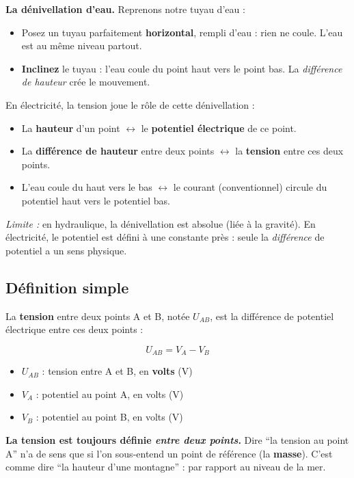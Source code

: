 \documentclass[12pt,a4paper,twoside]{book}
\begin{document}
\begin{analogie}
\textbf{La dénivellation d'eau.} Reprenons notre tuyau d'eau :
\begin{itemize}[nosep]
\item Posez un tuyau parfaitement \textbf{horizontal}, rempli d'eau : rien ne coule. L'eau est au même niveau partout.
\item \textbf{Inclinez} le tuyau : l'eau coule du point haut vers le point bas. La \textit{différence de hauteur} crée le mouvement.
\end{itemize}
En électricité, la tension joue le rôle de cette dénivellation :
\begin{itemize}[nosep]
\item La \textbf{hauteur} d'un point $\leftrightarrow$ le \textbf{potentiel électrique} de ce point.
\item La \textbf{différence de hauteur} entre deux points $\leftrightarrow$ la \textbf{tension} entre ces deux points.
\item L'eau coule du haut vers le bas $\leftrightarrow$ le courant (conventionnel) circule du potentiel haut vers le potentiel bas.
\end{itemize}
\textit{Limite :} en hydraulique, la dénivellation est absolue (liée à la gravité). En électricité, le potentiel est défini à une constante près : seule la \textit{différence} de potentiel a un sens physique.
\end{analogie}

\subsection{Définition simple}

La \textbf{tension} entre deux points A et B, notée $U_{AB}$, est la différence de potentiel électrique entre ces deux points :

\begin{formule}
\[
\boxed{U_{AB} = V_A - V_B}
\]
\begin{itemize}[nosep]
\item $U_{AB}$ : tension entre A et B, en \textbf{volts} (V)
\item $V_A$ : potentiel au point A, en volts (V)
\item $V_B$ : potentiel au point B, en volts (V)
\end{itemize}
\end{formule}

\begin{attention}
\textbf{La tension est toujours définie \textit{entre deux points}.} Dire ``la tension au point A'' n'a de sens que si l'on sous-entend un point de référence (la \textbf{masse}). C'est comme dire ``la hauteur d'une montagne'' : par rapport au niveau de la mer.
\end{attention}
\end{document}
